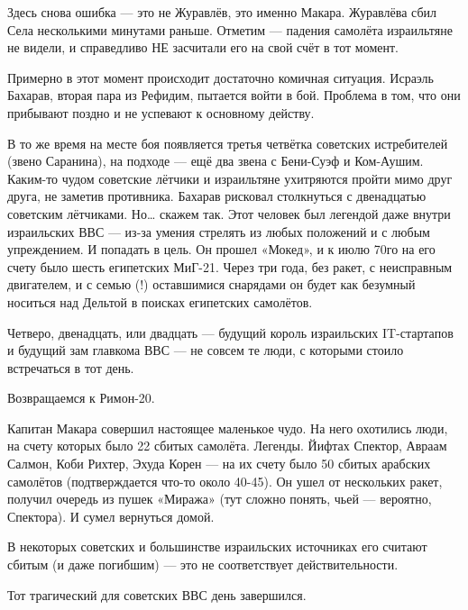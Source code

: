 Здесь снова ошибка — это не Журавлёв, это именно Макара. Журавлёва сбил Села несколькими минутами раньше. Отметим — падения самолёта израильтяне не видели, и справедливо НЕ засчитали его на свой счёт в тот момент.

Примерно в этот момент происходит достаточно комичная ситуация. Исраэль Бахарав, вторая пара из Рефидим, пытается войти в бой. Проблема в том, что они прибывают поздно и не успевают к основному действу.

В то же время на месте боя появляется третья четвётка советских истребителей (звено Саранина), на подходе — ещё два звена с Бени-Суэф и Ком-Аушим. Каким-то чудом советские лётчики и израильтяне ухитряются пройти мимо друг друга, не заметив противника. Бахарав рисковал столкнуться с двенадцатью советским лётчиками. Но… скажем так. Этот человек был легендой даже внутри израильских ВВС — из-за умения стрелять из любых положений и с любым упреждением. И попадать в цель. Он прошел «Мокед», и к июлю 70го на его счету было шесть египетских МиГ-21. Через три года, без ракет, с неисправным двигателем, и с семью (!) оставшимися снарядами он будет как безумный носиться над Дельтой в поисках египетских самолётов.

Четверо, двенадцать, или двадцать — будущий король израильских IT-стартапов и будущий зам главкома ВВС — не совсем те люди, с которыми стоило встречаться в тот день.

Возвращаемся к Римон-20.

Капитан Макара совершил настоящее маленькое чудо. На него охотились люди, на счету которых было 22 сбитых самолёта. Легенды. Йифтах Спектор, Авраам Салмон, Коби Рихтер, Эхуда Корен — на их счету было 50 сбитых арабских самолётов (подтверждается что-то около 40-45). Он ушел от нескольких ракет, получил очередь из пушек «Миража» (тут сложно понять, чьей — вероятно, Спектора). И сумел вернуться домой.

В некоторых советских и большинстве израильских источниках его считают сбитым (и даже погибшим) — это не соответствует действительности.

Тот трагический для советских ВВС день завершился.

